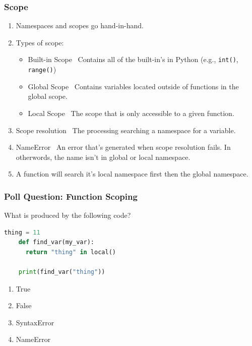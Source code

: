 \documentclass{beamer}
\begin{document}
%
%
\begin{frame}[fragile]
  \frametitle{Scope}
  \begin{enumerate}[A]
    \item Namespaces and scopes go hand-in-hand.
    \pause
    \item Types of scope:
      \begin{itemize}
        \item Built-in Scope \textrightarrow \ Contains all of the built-in's in Python (e.g., \lstinline|int()|, \lstinline|range()|)
        \pause
        \item Global Scope \textrightarrow \ Contains variables located outside of functions in the global scope.
        \pause
        \item Local Scope \textrightarrow \ The scope that is only accessible to a given function.
        \pause
      \end{itemize}
    \item Scope resolution \textrightarrow \ The processing searching a namespace for a variable.
    \pause
    \item NameError \textrightarrow \ An error that's generated when scope resolution fails. In otherwords, the name isn't in global or local namespace.
    \pause
    \item A function will search it's local namespace first then the global namespace.
  \end{enumerate}
\end{frame}

%
%
\begin{frame}[fragile]
  \frametitle{Poll Question: Function Scoping}
  \begin{minipage}{0.69\textwidth}
    What is produced by the following code?
    \begin{lstlisting}[language=Python, autogobble]
    thing = 11
    def find_var(my_var):
      return "thing" in local()

    print(find_var("thing"))
    \end{lstlisting}
  \end{minipage}
  \hfill
  \begin{minipage}{0.29\textwidth}
    \begin{enumerate}[A]
      \item True
      \item False
      \item SyntaxError
      \item NameError
    \end{enumerate}
  \end{minipage}
\end{frame}
\end{document}
